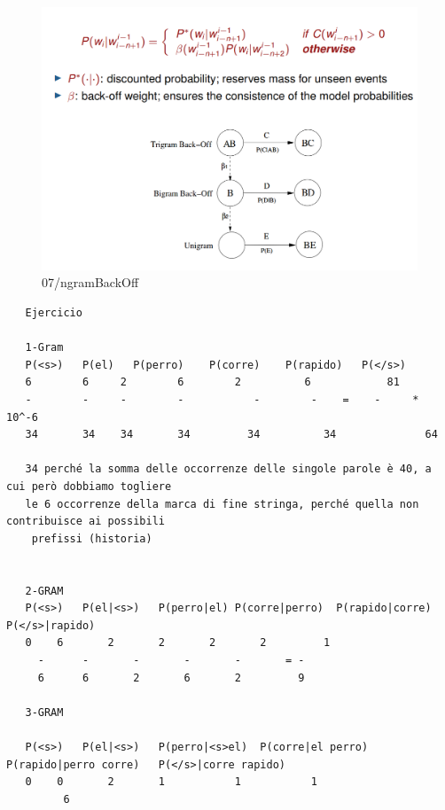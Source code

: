\begin{figure}[htbp]
   \centering
   \includegraphics{images/07/ngramBackOff.png}
   \caption{07/ngramBackOff}
   \label{fig:07/ngramBackOff}
\end{figure}


\begin{verbatim}
   Ejercicio

   1-Gram
   P(<s>)	P(el)	P(perro)	P(corre)	P(rapido)	P(</s>)
   6        6     2        6        2	       6	        81
   -        -     -        -	       -        -    =    -     * 10^-6
   34       34    34       34	      34	      34		      64
   
   34 perché la somma delle occorrenze delle singole parole è 40, a cui però dobbiamo togliere 
   le 6 occorrenze della marca di fine stringa, perché quella non contribuisce ai possibili
    prefissi (historia)    

   
   2-GRAM
   P(<s>) 	P(el|<s>)	P(perro|el)	P(corre|perro)	P(rapido|corre)	P(</s>|rapido)
   0	6		2		2		2		2		  1
     -		-		-		-		-		= -		
     6		6		2		6		2		  9
   
   3-GRAM
   
   P(<s>)	P(el|<s>)	P(perro|<s>el)	P(corre|el perro)	P(rapido|perro corre)	P(</s>|corre rapido)
   0	0		2		1			1			1
         6

\end{verbatim}

